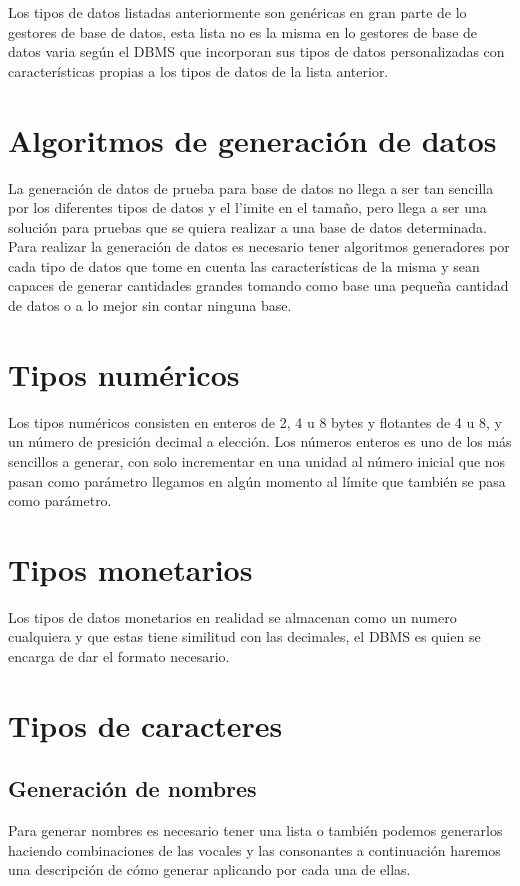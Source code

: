 Los tipos de datos listadas anteriormente son gen\'ericas en gran parte de lo gestores de base de datos, esta lista no es la misma en lo  gestores de base de datos varia seg\'un el DBMS que incorporan sus tipos de datos personalizadas con caracter\'isticas propias a los tipos de datos de la lista anterior.
\section{Algoritmos de generaci\'on de datos}
La generaci\'on de datos de prueba para base de datos no llega a ser tan sencilla por los diferentes tipos de datos y el l'imite en el tama\~no, pero llega a ser una soluci\'on  para pruebas que se quiera realizar a una base de datos determinada. Para realizar la generaci\'on de datos  es necesario tener algoritmos generadores por cada tipo de datos que tome en cuenta las caracter\'isticas de la misma  y sean capaces de generar cantidades grandes tomando como base una peque\~na cantidad de datos o a lo mejor sin contar ninguna base.
\section{Tipos num\'ericos}
Los tipos num\'ericos consisten en enteros de 2, 4 u 8 bytes y flotantes de 4 u 8, y un n\'umero de presici\'on decimal a elecci\'on.
Los n\'umeros enteros es uno de los m\'as sencillos a generar, con solo incrementar en una unidad al n\'umero  inicial que nos pasan como par\'ametro llegamos en alg\'un momento al l\'imite que tambi\'en se pasa como par\'ametro.
\section{Tipos monetarios}
Los tipos de datos monetarios en realidad se almacenan como un numero cualquiera y que estas tiene similitud con las decimales, el DBMS es quien se encarga de dar el formato necesario. 
\section{Tipos de caracteres}
\subsection{Generaci\'on de nombres}
Para generar nombres es necesario tener una lista o tambi\'en podemos generarlos haciendo combinaciones de las vocales y las consonantes a continuaci\'on haremos una descripci\'on de c\'omo generar aplicando por cada una de ellas.
